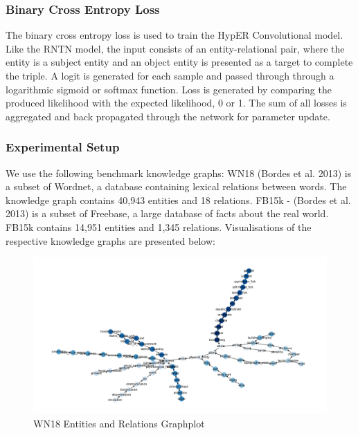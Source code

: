 \subsubsection{Binary Cross Entropy Loss}
The binary cross entropy loss \cite{reference} is used to train the HypER Convolutional model. Like the RNTN model, the input consists of an entity-relational pair, where the entity is a subject entity and an object entity is presented as a target to complete the triple. A logit is generated for each sample and passed through through a logarithmic sigmoid or softmax function. Loss is generated by comparing the produced likelihood with the expected likelihood, 0 or 1. The sum of all losses is aggregated and back propagated through the network for parameter update. \newline

\subsubsection{Experimental Setup} 

We use the following benchmark knowledge graphs: WN18 (Bordes et al. 2013) is a subset of Wordnet, a database containing lexical relations between words. The knowledge graph contains 40,943 entities and 18 relations. \newline 
FB15k - (Bordes et al. 2013) is a subset of Freebase, a large database of facts about the real world. FB15k contains 14,951 entities and 1,345 relations. \newline \newline
Visualisations of the respective knowledge graphs are presented below:

\begin{figure}[H]
  	\caption{WN18 Entities and Relations Graphplot}
   	\centering
    	\includegraphics[width=\textwidth]{WN18_Graph}
\end{figure}

